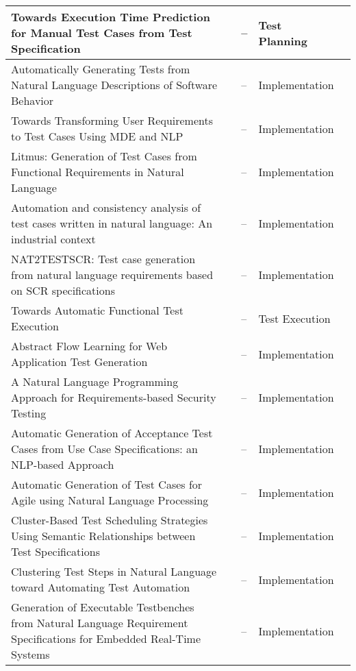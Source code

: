 \begin{appendices}
\begin{table}[H]
{\begin{tabular}{ |p{3cm}|p{3cm}|p{3cm}|p{3cm}|p{3cm}| }
            \hline Towards Execution Time Prediction for Manual Test Cases from Test Specification  & \cite{8051381} & --& Test Planning\\
            \hline Automatically Generating Tests from Natural Language Descriptions of Software Behavior  & \cite{kamalakar2013automatically} & --& Implementation\\
            \hline Towards Transforming User Requirements to Test Cases Using MDE and NLP & \cite{allala2019towards} & --& Implementation\\
            \hline Litmus: Generation of Test Cases from Functional Requirements in Natural Language  & \cite{litmus} & --& Implementation\\
            \hline Automation and consistency analysis of test cases written in natural language: An industrial context & \cite{arruda2020automation} & --& Implementation\\
            \hline NAT2TESTSCR: Test case generation from natural language requirements based on SCR specifications  & \cite{carvalho2014nat2testscr} & --& Implementation\\
            \hline Towards Automatic Functional Test Execution & \cite{pedemonte2012towards} & --& Test Execution\\
            \hline Abstract Flow Learning for Web Application Test Generation  & \cite{10.1145/3278186.3278194} & --& Implementation\\
            \hline A Natural Language Programming Approach for Requirements-based Security Testing & \cite{mai2018natural} & --& Implementation\\
            \hline Automatic Generation of Acceptance Test Cases from Use Case Specifications: an NLP-based Approach & \cite{wang2020automatic} & --& Implementation\\
            \hline Automatic Generation of Test Cases for Agile using Natural Language Processing & \cite{rane2017automatic} & --& Implementation\\
            \hline Cluster-Based Test Scheduling Strategies Using Semantic Relationships between Test Specifications & \cite{10.1145/3195538.3195540} & --& Implementation\\
            \hline Clustering Test Steps in Natural Language toward Automating Test Automation & \cite{10.1145/3368089.3417067} & --& Implementation\\
            \hline Generation of Executable Testbenches from Natural Language Requirement Specifications for Embedded Real-Time Systems & \cite{mueller2010generation} & --& Implementation\\

\end{tabular}}
\end{table}
\end{appendices}
